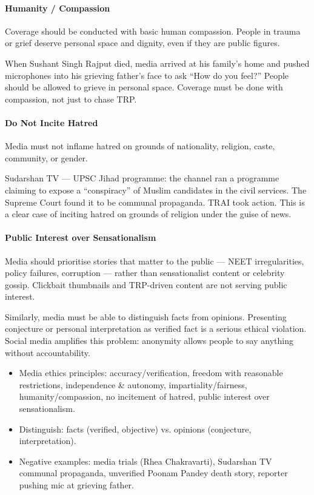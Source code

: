 \paragraph{Humanity / Compassion} Coverage should be conducted with basic human compassion. People in trauma or grief deserve personal space and dignity, even if they are public figures.

\begin{ExampleBox}
When Sushant Singh Rajput died, media arrived at his family's home and pushed microphones into his grieving father's face to ask ``How do you feel?'' People should be allowed to grieve in personal space. Coverage must be done with compassion, not just to chase TRP.
\end{ExampleBox}

\paragraph{Do Not Incite Hatred} Media must not inflame hatred on grounds of nationality, religion, caste, community, or gender.

\begin{ExampleBox}
Sudarshan TV --- UPSC Jihad programme: the channel ran a programme claiming to expose a ``conspiracy'' of Muslim candidates in the civil services. The Supreme Court found it to be communal propaganda. TRAI took action. This is a clear case of inciting hatred on grounds of religion under the guise of news.
\end{ExampleBox}

\paragraph{Public Interest over Sensationalism} Media should prioritise stories that matter to the public --- NEET irregularities, policy failures, corruption --- rather than sensationalist content or celebrity gossip. Clickbait thumbnails and TRP-driven content are not serving public interest.

Similarly, media must be able to distinguish facts from opinions. Presenting conjecture or personal interpretation as verified fact is a serious ethical violation. Social media amplifies this problem: anonymity allows people to say anything without accountability.

\begin{QuickRevision}
\begin{itemize}
\item Media ethics principles: accuracy/verification, freedom with reasonable restrictions, independence \& autonomy, impartiality/fairness, humanity/compassion, no incitement of hatred, public interest over sensationalism.
\item Distinguish: facts (verified, objective) vs. opinions (conjecture, interpretation).
\item Negative examples: media trials (Rhea Chakravarti), Sudarshan TV communal propaganda, unverified Poonam Pandey death story, reporter pushing mic at grieving father.
\end{itemize}
\end{QuickRevision}

